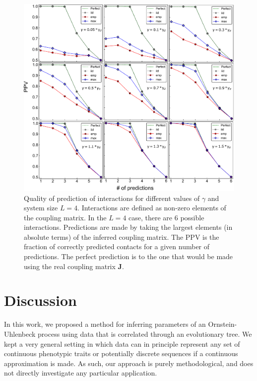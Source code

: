 \documentclass[preprint,amsmath,amssymb,superscriptaddress,showpacs,pre]{revtex4-1}
\begin{document}
\begin{figure}[!htb]
	\centering
	\includegraphics[keepaspectratio=true,width=1.0\textwidth]{Figures/PPVs_L4.pdf}
	\caption{Quality of prediction of interactions for  different values of $\gamma$ and system size $L=4$. Interactions are defined as non-zero elements of the coupling matrix. In the $L=4$ case, there are $6$ possible interactions. Predictions are made by taking the largest elements (in absolute terms) of the inferred coupling matrix. The PPV is the fraction of correctly predicted contacts for a given number of predictions. The perfect prediction is to the one that would be made using the real coupling matrix $\bm{J}$.}
	\label{fig:PPV_L4}
\end{figure}


  



\section{Discussion}
\label{sec:discussion}

In this work, we proposed a method for inferring parameters of an Ornstein-Uhlenbeck process using data that is correlated through an evolutionary tree. 
We kept a very general setting in which data can in principle represent any set of continuous phenotypic traits or potentially discrete sequences if a continuous approximation is made. 
As such, our approach is purely methodological, and does not directly investigate any particular application. 
\end{document}
